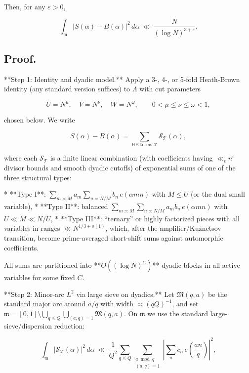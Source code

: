 \documentclass[11pt]{article}
\theoremstyle{definition}
\theoremstyle{remark}
\begin{document}
Then, for any $\varepsilon>0$,

$$
	\int_{\mathfrak m}\big|S(\alpha)-B(\alpha)\big|^2\,d\alpha
	\ \ll\ \frac{N}{(\log N)^{3+\varepsilon}}.
$$

\subsection*{Proof.}

**Step 1: Identity and dyadic model.**
Apply a 3-, 4-, or 5-fold Heath-Brown identity (any standard version suffices) to $\Lambda$ with cut parameters

$$
	U=N^{\mu},\quad V=N^{\nu},\quad W=N^{\omega},\qquad 0<\mu\le\nu\le\omega<1,
$$

chosen below. We write

$$
	S(\alpha)-B(\alpha)
	=\sum_{\text{HB terms }\mathcal T} \mathcal S_{\mathcal T}(\alpha),
$$

where each $\mathcal S_{\mathcal T}$ is a finite linear combination (with coefficients having $\ll_\epsilon n^\epsilon$ divisor bounds and smooth dyadic cutoffs) of exponential sums of one of the three structural types:

* **Type I**: $\displaystyle \sum_{m\asymp M} a_m \sum_{n\asymp N/M} b_n\,e(\alpha mn)$ with $M\le U$ (or the dual small variable),
* **Type II**: balanced $\displaystyle \sum_{m\asymp M}\sum_{n\asymp N/M} a_m b_n\,e(\alpha mn)$ with $U\ll M\ll N/U$,
* **Type III**: “ternary” or highly factorized pieces with all variables in ranges $ \ll N^{1/3+o(1)}$, which, after the amplifier/Kuznetsov transition, become prime-averaged short-shift sums against automorphic coefficients.

All sums are partitioned into **$O((\log N)^C)$** dyadic blocks in all active variables for some fixed $C$.

**Step 2: Minor-arc $L^2$ via large sieve on dyadics.**
Let $\mathfrak M(q,a)$ be the standard major arc around $a/q$ with width $\asymp (qQ)^{-1}$, and set $\mathfrak m=[0,1]\setminus \bigcup_{q\le Q}\bigcup_{(a,q)=1}\mathfrak M(q,a)$. On $\mathfrak m$ we use the standard large-sieve/dispersion reduction:

\begin{equation}
	\int_{\mathfrak m} \big|\mathcal S_{\mathcal T}(\alpha)\big|^2\,d\alpha
	\ \ll\ \frac{1}{Q^2}\sum_{q\le Q}\sum_{\substack{a\bmod q\\(a,q)=1}}
	\left|\sum_{n} c_n\,e\!\left(\frac{an}{q}\right)\right|^2,
	\tag{D.3}
\end{equation}
\end{document}
